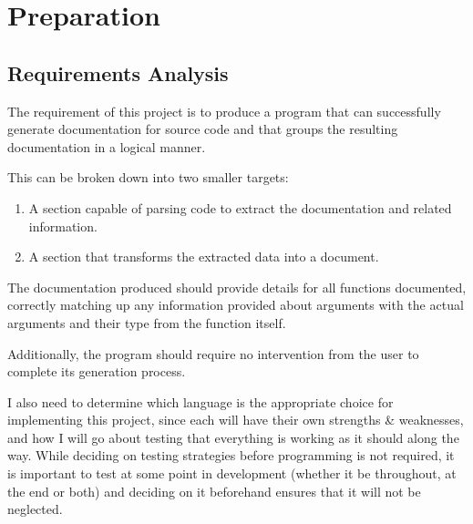 



\chapter{Preparation}
\section{Requirements Analysis}

The requirement of this project is to produce a program that can successfully
generate documentation for source code and that groups the resulting
documentation in a logical manner.

This can be broken down into two smaller targets:
\begin{enumerate}
  \item A section capable of parsing code to extract the documentation and
    related information.
  \item A section that transforms the extracted data into a document.
\end{enumerate}

The documentation produced should provide details for all functions documented,
correctly matching up any information provided about arguments with the actual
arguments and their type from the function itself.

Additionally, the program should require no intervention from the user to
complete its generation process.

I also need to determine which language is the appropriate choice for
implementing this project, since each will have their own strengths \&
weaknesses, and how I will go about testing that everything is working as it
should along the way. While deciding on testing strategies before programming is
not required, it is important to test at some point in development (whether it
be throughout, at the end or both) and deciding on it beforehand ensures that it
will not be neglected.


